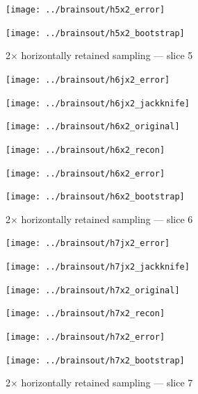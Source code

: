 \documentclass[article]{jdssv}
\begin{document}
\begin{appendix}
\begin{figure}
\begin{centering}
\parbox{\imsize}{\texttt{[image: ../brainsout/h5x2\_error]}}
\parbox{\imsize}{\texttt{[image: ../brainsout/h5x2\_bootstrap]}}

\end{centering}
\caption{2$\times$ horizontally retained sampling --- slice 5}
\end{figure}


\begin{figure}
\begin{centering}

\parbox{\imsize}{\texttt{[image: ../brainsout/h6jx2\_error]}}
\parbox{\imsize}{\texttt{[image: ../brainsout/h6jx2\_jackknife]}}

\vspace{\vertsep}

\parbox{\imsize}{\texttt{[image: ../brainsout/h6x2\_original]}}
\parbox{\imsize}{\texttt{[image: ../brainsout/h6x2\_recon]}}

\vspace{\vertsep}

\parbox{\imsize}{\texttt{[image: ../brainsout/h6x2\_error]}}
\parbox{\imsize}{\texttt{[image: ../brainsout/h6x2\_bootstrap]}}

\end{centering}
\caption{2$\times$ horizontally retained sampling --- slice 6}
\end{figure}


\begin{figure}
\begin{centering}

\parbox{\imsize}{\texttt{[image: ../brainsout/h7jx2\_error]}}
\parbox{\imsize}{\texttt{[image: ../brainsout/h7jx2\_jackknife]}}

\vspace{\vertsep}

\parbox{\imsize}{\texttt{[image: ../brainsout/h7x2\_original]}}
\parbox{\imsize}{\texttt{[image: ../brainsout/h7x2\_recon]}}

\vspace{\vertsep}

\parbox{\imsize}{\texttt{[image: ../brainsout/h7x2\_error]}}
\parbox{\imsize}{\texttt{[image: ../brainsout/h7x2\_bootstrap]}}

\end{centering}
\caption{2$\times$ horizontally retained sampling --- slice 7}
\end{figure}


\begin{figure}
\begin{centering}


\end{centering}
\end{figure}
\end{appendix}
\end{document}
